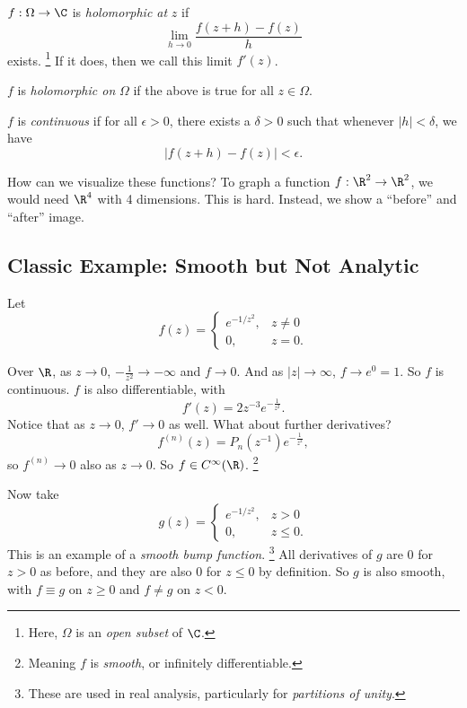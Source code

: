 \begin{tcolorbox}[title=Definition (Holomorphic)]
  $f : \Omega \to \C$ is \textit{holomorphic at} $z$ if
  \[
    \lim_{h \to 0} \frac{f(z + h) - f(z)}{h}
  \]
  exists.
  \footnote{Here, $\Omega$ is an \textit{open subset} of
    $\C$.}
  If it does, then we call this limit $f'(z)$.

  $f$ is \textit{holomorphic on}
  $\Omega$ if the above is true for all $z \in \Omega$.
\end{tcolorbox}

\begin{tcolorbox}[title=Definition (Continuity)]
  $f$ is \textit{continuous} if for all $\epsilon > 0$,
  there exists a $\delta > 0$ such that whenever
  $|h|  < \delta$, we have
  \[
  |f(z + h) - f(z)| < \epsilon
  .\] 
\end{tcolorbox}

How can we visualize these functions?
To graph a function $f : \R^2 \to \R^2$, we would need
$\R^4$ with 4 dimensions. This is hard. Instead,
we show a ``before'' and ``after'' image.


\subsection{Classic Example: Smooth but Not Analytic}
Let
\[
f(z) =
\begin{cases}
  e^{-1 / z^2}, & z \neq 0 \\
  0, & z = 0.
\end{cases}
\] 

Over $\R$, as $z \to 0$, $-\frac{1}{z^2} \to -\infty$
and $f \to 0$.  And as $|z| \to \infty$, $f \to e^0 = 1$. 
So $f$ is continuous. $f$ is also differentiable,
with
\[f'(z) = 2z^{-3}e^{-\frac{1}{z^2}}.\]
Notice that as $z \to 0$, $f' \to 0$ as well. What
about further derivatives?
\[
  f^{(n)}(z) = P_n(z^{-1})e^{-\frac{1}{z^2}}
,\] 
so $f^{(n)} \to 0$ also as $z \to 0$. So
$f \in C^\infty(\R)$.
\footnote{Meaning $f$ is \textit{smooth}, or infinitely
differentiable.}

Now take
\[
g(z) =
\begin{cases}
  e^{-1 / z^2}, & z > 0 \\
  0, & z \le 0.
\end{cases}
\]
This is an example of a \textit{smooth bump function}.
\footnote{These are used in real analysis, particularly
for \textit{partitions of unity}.}
All derivatives of $g$ are $0$ for $z > 0$ as before,
and they are also $0$ for $z \le 0$ by definition. So
$g$ is also smooth, with $f \equiv g$ on $z \ge 0$ and
$f \ne g$ on $z < 0$.

